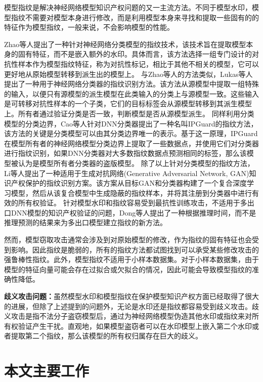 模型指纹是解决神经网络模型知识产权问题的又一主流方法。不同于模型水印，模型指纹不需要对模型本身进行修改，而是利用模型本身来寻找和提取一些固有的的特征作为模型指纹，一般来说，不会影响模型的性能。

Zhao等人\cite{zhao2020afa}提出了一种针对神经网络分类模型的指纹技术，该技术旨在提取模型本身的固有特征，而不是嵌入额外的水印。具体而言，该方法选择一组专门设计的对抗性样本作为模型指纹特征，称为对抗性标记，相比于其他不相关的模型，它可以更好地从原始模型转移到派生出的模型上。
与Zhao等人\cite{zhao2020afa}的方法类似，Lukas等人\cite{lukas2019deep}提出了一种用于神经网络分类器的指纹识别方法。该方法从源模型中提取一组特殊的输入，以便只有源模型的派生模型在此类输入的分类上与源模型一致。这些输入是可转移对抗性样本的一个子类，它们的目标标签会从源模型转移到其派生模型上。所有者通过验证分类是否一致，判断模型是否从源模型派生。
同样利用分类模型的分类边界，Cao等人\cite{cao2021ipguard}针对DNN分类器提出了一种名叫IPGuard的指纹方法，该方法的关键是分类模型可以由其分类边界唯一的表示。基于这一原理，IPGuard在模型所有者的神经网络模型分类边界上提取了一些数据点，并使用它们对分类器进行指纹识别，如果DNN分类器对大多数指纹数据点预测相同的标签，那么该模型被认为是模型所有者分类器的盗版模型。
除了以上针对分类模型的指纹方法，Li等人\cite{li2021novel}提出了一种适用于生成对抗网络(Generative Adversarial Network, GAN)\cite{goodfellow2020generative}知识产权保护的指纹识别方案。该方案从目标GAN和分类器构建了一个复合深度学习模型，然后从该复合模型中生成隐蔽的指纹样本，并将其注册到分类器中进行有效的所有权验证。
针对模型水印和指纹容易受到最抗性训练攻击，不适用于多出口DNN模型的知识产权验证的问题，Dong等人\cite{dong2021fingerprinting}提出了一种根据推理时间，而不是推理预测的结果来为多出口模型建立指纹的新方法。

然而，模型窃取攻击通常会涉及到对原始模型的修改，作为指纹的固有特征也会受到影响。因此指纹是脆弱的，所有的指纹方法都试图找到可以承受某些修改攻击的强鲁棒性指纹。此外，模型指纹不适用于小样本数据集。对于小样本数据集，由于模型的特征向量可能会存在过拟合或欠拟合的情况，因此可能会导致模型指纹的准确性降低。

\textbf{歧义攻击问题：}虽然模型水印和模型指纹在保护模型知识产权方面已经取得了很大的进展，但除了上述提到的问题外，无论是水印还是指纹都容易受到歧义攻击\cite{fan2019rethinking,li2019piracy}。歧义攻击是指不法分子盗窃模型后，通过为神经网络模型伪造其他水印或指纹来对所有权验证产生干扰。直观地，如果模型盗窃者可以在水印模型上嵌入第二个水印或者提取第二个指纹，那么该模型的所有权归属存在巨大的歧义。


\section{本文主要工作}

